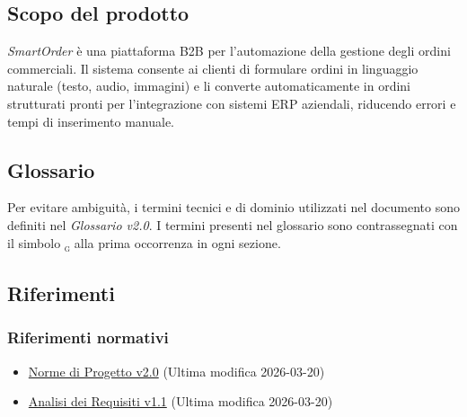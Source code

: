 \documentclass[a4paper, 11pt, oneside]{scrartcl}
\begin{document}
\subsection{Scopo del prodotto}
\textit{SmartOrder} \`e una piattaforma B2B per l'automazione della gestione degli ordini commerciali. Il sistema consente ai clienti di formulare ordini in linguaggio naturale (testo, audio, immagini) e li converte automaticamente in ordini strutturati pronti per l'integrazione con sistemi ERP aziendali, riducendo errori e tempi di inserimento manuale.

\subsection{Glossario}
Per evitare ambiguit\`a, i termini tecnici e di dominio utilizzati nel documento sono definiti nel \textit{Glossario v2.0}.
I termini presenti nel glossario sono contrassegnati con il simbolo \textsubscript{\textsc{g}} alla prima occorrenza in ogni sezione.

\subsection{Riferimenti}

\subsubsection{Riferimenti normativi}
\begin{itemize}
    \item \href{https://swenightpro.github.io/Documentazione/docs/RTB/Documentazione%20Interna/Norme_di_Progetto_v2.0.pdf}{Norme di Progetto v2.0} (Ultima modifica 2026-03-20)
    \item \href{https://swenightpro.github.io/Documentazione/docs/RTB/Documentazione%20Esterna/Analisi_dei_Requisiti_v1.1.pdf}{Analisi dei Requisiti v1.1} (Ultima modifica 2026-03-20)
\end{itemize}
\end{document}
